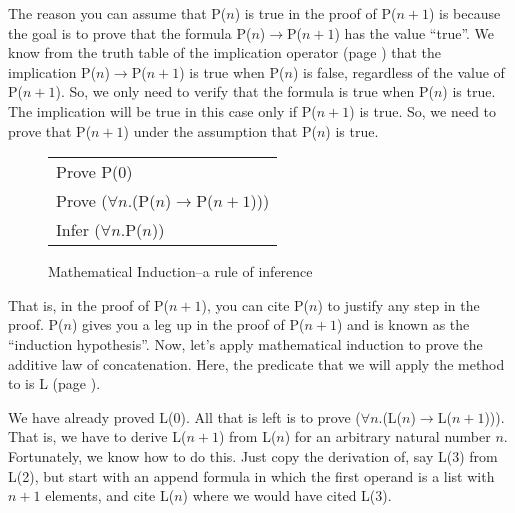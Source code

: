 The reason you can assume that P($n$) is true in the proof of P($n+1$)
is because the goal is to prove that the formula
P($n$)$\rightarrow$P($n+1$) has the value ``true''.
We know from the truth table of the implication operator
(page \pageref{implication-truth-table}) that the implication
P($n$)$\rightarrow$P($n+1$) is true when P($n$) is false,
regardless of the value of P($n+1$).
So, we only need to verify that the formula is true when P($n$) is true.
The implication will be true in this case only if P($n+1$) is true.
So, we need to prove that P($n+1$) under the assumption that P($n$) is true.
\begin{figure}
\label{fig-04-01}
\begin{center}
\begin{tabular}{l}
Prove P(0) \\
Prove ($\forall$$n$.(P($n$)$\rightarrow$P($n+1$))) \\
\hline
Infer ($\forall$$n$.P($n$))
\end{tabular}
\end{center}
\caption{Mathematical Induction--a rule of inference}
\label{induction-rule}
\end{figure}

That is, in the proof of P($n+1$), you can cite P($n$) to justify any step in the proof.
\label{induction-hyp-def}
P($n$) gives you a leg up in the proof of P($n+1$) and is known as the ``induction hypothesis''.
Now, let's apply mathematical induction to prove
the additive law of concatenation.
Here, the predicate that we will apply the method to is L (page \pageref{additive-concat-law-predicate}).

\label{len-additive-thm}
We have already proved L(0).
All that is left is to prove ($\forall$$n$.(L($n$)$\rightarrow$L($n+1$))).
That is, we have to derive L($n+1$) from L($n$) for an arbitrary natural number $n$.
Fortunately, we know how to do this. Just copy the derivation of,
say L(3) from L(2), but start with an append formula in which the first operand
is a list with $n+1$ elements, and cite L($n$) where we would have cited L(3).

